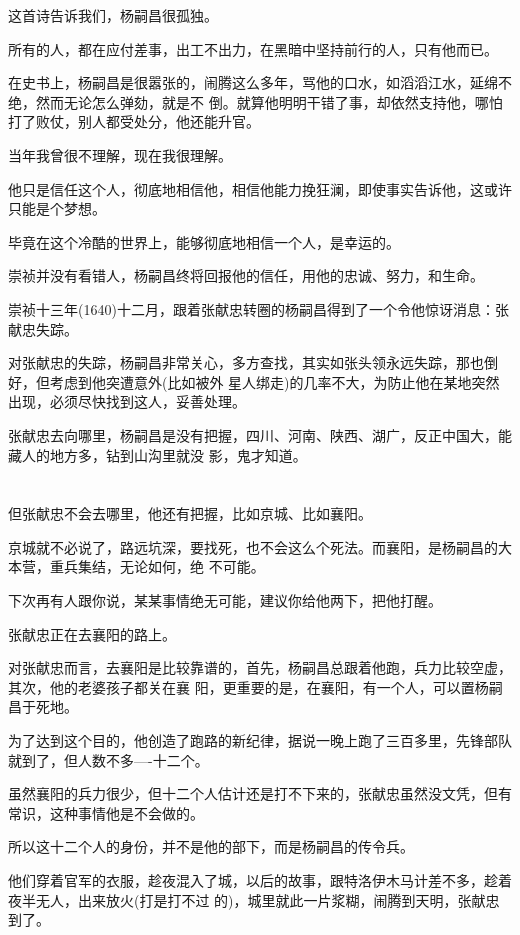 \documentclass[11pt,a4paper,onecolumn]{article}
\begin{document}
这首诗告诉我们，杨嗣昌很孤独。

所有的人，都在应付差事，出工不出力，在黑暗中坚持前行的人，只有他而已。

在史书上，杨嗣昌是很嚣张的，闹腾这么多年，骂他的口水，如滔滔江水，延绵不绝，然而无论怎么弹劾，就是不
倒。就算他明明干错了事，却依然支持他，哪怕打了败仗，别人都受处分，他还能升官。

当年我曾很不理解，现在我很理解。

他只是信任这个人，彻底地相信他，相信他能力挽狂澜，即使事实告诉他，这或许只能是个梦想。

毕竟在这个冷酷的世界上，能够彻底地相信一个人，是幸运的。

崇祯并没有看错人，杨嗣昌终将回报他的信任，用他的忠诚、努力，和生命。

崇祯十三年(1640)十二月，跟着张献忠转圈的杨嗣昌得到了一个令他惊讶消息：张献忠失踪。

对张献忠的失踪，杨嗣昌非常关心，多方查找，其实如张头领永远失踪，那也倒好，但考虑到他突遭意外(比如被外
星人绑走)的几率不大，为防止他在某地突然出现，必须尽快找到这人，妥善处理。

张献忠去向哪里，杨嗣昌是没有把握，四川、河南、陕西、湖广，反正中国大，能藏人的地方多，钻到山沟里就没
影，鬼才知道。

\section[\thesection]{}

但张献忠不会去哪里，他还有把握，比如京城、比如襄阳。

京城就不必说了，路远坑深，要找死，也不会这么个死法。而襄阳，是杨嗣昌的大本营，重兵集结，无论如何，绝
不可能。

下次再有人跟你说，某某事情绝无可能，建议你给他两下，把他打醒。

张献忠正在去襄阳的路上。

对张献忠而言，去襄阳是比较靠谱的，首先，杨嗣昌总跟着他跑，兵力比较空虚，其次，他的老婆孩子都关在襄
阳，更重要的是，在襄阳，有一个人，可以置杨嗣昌于死地。

为了达到这个目的，他创造了跑路的新纪律，据说一晚上跑了三百多里，先锋部队就到了，但人数不多----十二个。

虽然襄阳的兵力很少，但十二个人估计还是打不下来的，张献忠虽然没文凭，但有常识，这种事情他是不会做的。

所以这十二个人的身份，并不是他的部下，而是杨嗣昌的传令兵。

他们穿着官军的衣服，趁夜混入了城，以后的故事，跟特洛伊木马计差不多，趁着夜半无人，出来放火(打是打不过
的)，城里就此一片浆糊，闹腾到天明，张献忠到了。
\end{document}
